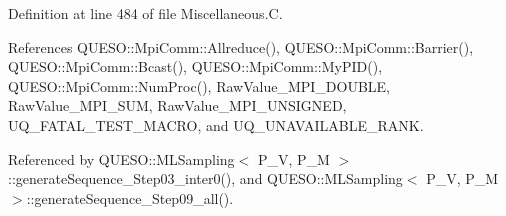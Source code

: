 Definition at line 484 of file Miscellaneous.\-C.



References Q\-U\-E\-S\-O\-::\-Mpi\-Comm\-::\-Allreduce(), Q\-U\-E\-S\-O\-::\-Mpi\-Comm\-::\-Barrier(), Q\-U\-E\-S\-O\-::\-Mpi\-Comm\-::\-Bcast(), Q\-U\-E\-S\-O\-::\-Mpi\-Comm\-::\-My\-P\-I\-D(), Q\-U\-E\-S\-O\-::\-Mpi\-Comm\-::\-Num\-Proc(), Raw\-Value\-\_\-\-M\-P\-I\-\_\-\-D\-O\-U\-B\-L\-E, Raw\-Value\-\_\-\-M\-P\-I\-\_\-\-S\-U\-M, Raw\-Value\-\_\-\-M\-P\-I\-\_\-\-U\-N\-S\-I\-G\-N\-E\-D, U\-Q\-\_\-\-F\-A\-T\-A\-L\-\_\-\-T\-E\-S\-T\-\_\-\-M\-A\-C\-R\-O, and U\-Q\-\_\-\-U\-N\-A\-V\-A\-I\-L\-A\-B\-L\-E\-\_\-\-R\-A\-N\-K.



Referenced by Q\-U\-E\-S\-O\-::\-M\-L\-Sampling$<$ P\-\_\-\-V, P\-\_\-\-M $>$\-::generate\-Sequence\-\_\-\-Step03\-\_\-inter0(), and Q\-U\-E\-S\-O\-::\-M\-L\-Sampling$<$ P\-\_\-\-V, P\-\_\-\-M $>$\-::generate\-Sequence\-\_\-\-Step09\-\_\-all().


